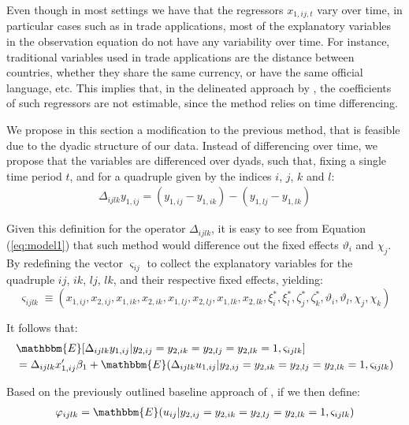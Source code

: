 Even though in most settings we have that the regressors $x_{1,ij,t}$ vary over time, in particular cases such as in trade applications, most of the explanatory variables in the observation equation do not have any variability over time. For instance, traditional variables used in trade applications are the distance between countries, whether they share the same currency, or have the same official language, etc. This implies that, in the delineated approach by \cite{kyriazidou1997estimation}, the coefficients of such regressors are not estimable, since the method relies on time differencing.

We propose in this section a modification to the previous method, that is feasible due to the dyadic structure of our data. Instead of differencing over time, we propose that the variables are differenced over dyads, such that, fixing a single time period $t$, and for a quadruple given by the indices $i$, $j$, $k$ and $l$:
\begin{align*}
    \Delta_{ijlk} y_{1,ij} = (y_{1,ij} - y_{1,ik}) - (y_{1,lj} - y_{1,lk}) 
\end{align*}

Given this definition for the operator $\Delta_{ijlk}$, it is easy to see from Equation (\ref{eq:model1}) that such method would difference out the fixed effects $\vartheta_i$ and $\chi_j$. By redefining the vector $\varsigma_{ij}$ to collect the explanatory variables for the quadruple $ij$, $ik$, $lj$, $lk$, and their respective fixed effects, yielding:
$$\varsigma_{ijlk} \equiv (x_{1,ij}, x_{2,ij}, x_{1,ik}, x_{2,ik}, x_{1,lj}, x_{2,lj}, x_{1,lk}, x_{2,lk},\xi_i^*, \xi_l^*,\zeta_j^*, \zeta_k^*, \vartheta_i, \vartheta_l, \chi_j, \chi_k)$$ 

It follows that:
\begin{align*}
    &\mathbbm{E}[\Delta_{ijlk} y_{1,ij} \rvert y_{2,ij} = y_{2,ik} = y_{2,lj} = y_{2,lk} =1, \varsigma_{ijlk}] \\
    &= \Delta_{ijlk} x_{1,ij}' \beta_1 + \mathbbm{E}(\Delta_{ijlk} u_{1,ij} \rvert y_{2,ij} = y_{2,ik} = y_{2,lj} = y_{2,lk} =1, \varsigma_{ijlk})
\end{align*}

Based on the previously outlined baseline approach of \cite{kyriazidou1997estimation}, if we then define:
\begin{align*}
    \varphi_{ijlk} = \mathbbm{E}(u_{ij} \rvert y_{2,ij} = y_{2,ik} = y_{2,lj} = y_{2,lk} =1, \varsigma_{ijlk})
\end{align*}

